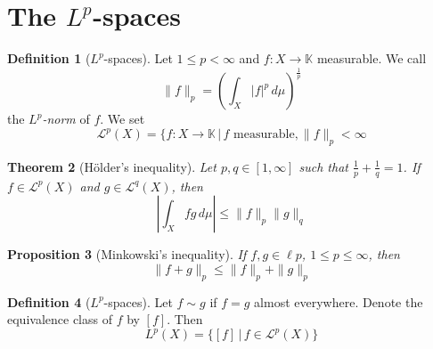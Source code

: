 \documentclass[10pt, oneside, reqno]{amsart}
\theoremstyle{plain}%
\newtheorem{thm}{Theorem}[section]
\newtheorem{prop}[thm]{Proposition}
\theoremstyle{definition}
\newtheorem{defn}[thm]{Definition}
\theoremstyle{remark}
\newcommand{\dmu}{\, d \mu}
\begin{document}



























\newcommand{\K}{\mathbb{K}}
\newcommand{\ellp}[1]{\mathcal{L}^{#1}(X)}
\newcommand{\Lp}[1]{L^{#1}(X)}

\section{The $L^p$-spaces} %
\label{sec:the_l_p_spaces}



\begin{defn}[$L^p$-spaces]
	Let $1 \leq p < \infty$ and $f:X \rightarrow \K$ measurable. We call \[
		\| f \|_p = \left(\int_X |f|^p \dmu\right)^\frac{1}{p}
	\]
	the \emph{$L^p$-norm} of $f$.  We set \[
		\ellp{p} = \{ f: X \rightarrow \K \, | \, f \text{ measurable}, \| f \|_p < \infty
	\]  
\end{defn}


\begin{thm}[H\"older's inequality]
	Let $p,q \in [1,\infty]$ such that $\frac{1}{p}+\frac{1}{q} = 1$.  If $f \in \ellp{p}$ and $g \in \ellp{q}$, then \[
		| \int_X fg \dmu | \leq \|f\|_p \|g\|_q
	\]
\end{thm}

\begin{prop}[Minkowski's inequality]
	If $f,g \in \ell{p}$, $1\leq p \leq \infty$, then \[
		\|f + g \|_p \leq \|f \|_p + \|g \|_p
	\]
\end{prop}

\begin{defn}[$L^p$-spaces]
	Let $f \sim g$ if $f = g$ almost everywhere.  Denote the equivalence class of $f$ by $[f]$.  Then \[
		\Lp{p} = \{ [f] \, | \, f \in \ellp{p} \} 
	\]
\end{defn}
\end{document}
